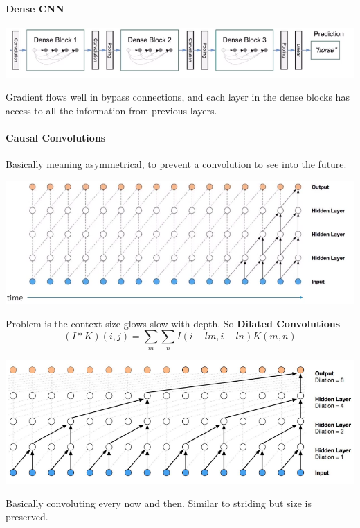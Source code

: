 \documentclass[10pt]{report}
\begin{document}
\paragraph{Dense CNN}
\begin{center}
	\includegraphics[scale=0.5]{69.png}
\end{center}
Gradient flows well in bypass connections, and each layer in the dense blocks has access to all the information from previous layers.
\paragraph{Causal Convolutions} Basically meaning asymmetrical, to prevent a convolution to see into the future.\begin{center}
	\includegraphics[scale=0.5]{70.png}
\end{center}
Problem is the context size glows slow with depth. So \textbf{Dilated Convolutions}
$$(I*K)(i,j)=\sum_m\sum_nI(i-lm,i-ln)K(m,n)$$
\begin{center}
	\includegraphics[scale=0.5]{71.png}
\end{center}
Basically convoluting every now and then. Similar to striding but size is preserved.
\end{document}
